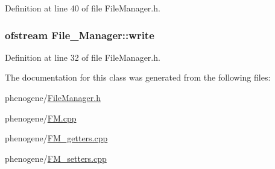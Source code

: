 Definition at line 40 of file File\-Manager.\-h.

\hypertarget{a00001_a7d29cb8d04a1a60638f653c28a628095}{
\subsubsection[{write}]{\setlength{\rightskip}{0pt plus 5cm}ofstream File\-\_\-\-Manager\-::write\hspace{0.3cm}{\ttfamily [private]}}}\label{d8/d84/a00001_a7d29cb8d04a1a60638f653c28a628095}


Definition at line 32 of file File\-Manager.\-h.



The documentation for this class was generated from the following files\-:\begin{DoxyCompactItemize}
\item 
phenogene/\hyperlink{a00004}{File\-Manager.\-h}\item 
phenogene/\hyperlink{a00005}{F\-M.\-cpp}\item 
phenogene/\hyperlink{a00006}{F\-M\-\_\-getters.\-cpp}\item 
phenogene/\hyperlink{a00007}{F\-M\-\_\-setters.\-cpp}\end{DoxyCompactItemize}
